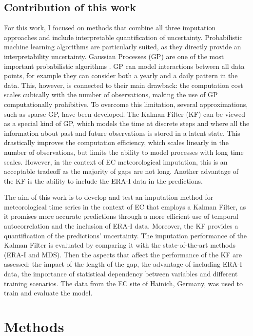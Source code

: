 \documentclass{article}
\let\Oldsection\section
\renewcommand{\section}{\FloatBarrier\Oldsection}
\let\Oldsubsection\subsection
\renewcommand{\subsection}{\FloatBarrier\Oldsubsection}
\begin{document}
\subsection{Contribution of this work}
For this work, I focused on methods that combine all three imputation approaches and include interpretable quantification of uncertainty. Probabilistic machine learning algorithms are particularly suited, as they directly provide an interpretability uncertainty.
Gaussian Processes (GP) are one of the most important probabilistic algorithms \cite{2020_hennig_pml}. GP can model interactions between all data points, for example they can consider both a yearly and a daily pattern in the data. This, however, is connected to their main drawback: the computation cost scales cubically with the number of observations, making the use of GP computationally prohibitive. To overcome this limitation, several approximations, such as sparse GP, have been developed. 
The Kalman Filter (KF) can be viewed as a special kind of GP, which models the time at discrete steps and where all the information about past and future observations is stored in a latent state. This drastically improves the computation efficiency, which scales linearly in the number of observations, but limits the ability to model processes with long time scales. However, in the context of EC meteorological imputation, this is an acceptable tradeoff as the majority of gaps are not long. Another advantage of the KF is the ability to include the ERA-I data in the predictions.

The aim of this work is to develop and test an imputation method for meteorological time series in the context of EC that employs a Kalman Filter, as it promises more accurate predictions through a more efficient use of temporal autocorrelation and the inclusion of ERA-I data. Moreover, the KF provides a quantification of the predictions' uncertainty.
The imputation performance of the Kalman Filter is evaluated by comparing it with the state-of-the-art methods (ERA-I and MDS). Then the aspects that affect the performance of the KF are assessed: the impact of the length of the gap, the advantage of including ERA-I data, the importance of statistical dependency between variables and different training scenarios. The data from the EC site of Hainich, Germany, was used to train and evaluate the model.


\section{Methods}
\end{document}
